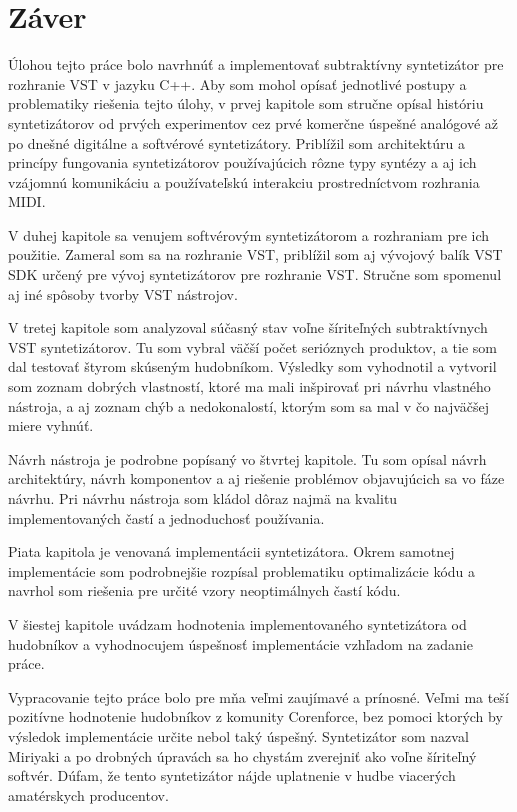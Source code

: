 \chapter*{Záver}



Úlohou tejto práce bolo navrhnúť a implementovať subtraktívny syntetizátor pre rozhranie VST v jazyku C++. Aby som mohol opísať jednotlivé postupy a problematiky riešenia tejto úlohy, v prvej kapitole som stručne opísal históriu syntetizátorov od prvých experimentov cez prvé komerčne úspešné analógové až po dnešné digitálne a softvérové syntetizátory. Priblížil som architektúru a princípy fungovania syntetizátorov používajúcich rôzne typy syntézy a aj ich vzájomnú komunikáciu a používateľskú interakciu prostredníctvom rozhrania MIDI.

V duhej kapitole sa venujem softvérovým syntetizátorom a rozhraniam pre ich použitie. Zameral som sa na rozhranie VST, priblížil som aj vývojový balík VST SDK určený pre vývoj syntetizátorov pre rozhranie VST. Stručne som spomenul aj iné spôsoby tvorby VST nástrojov. 

V tretej kapitole som analyzoval súčasný stav voľne šíriteľných subtraktívnych VST syntetizátorov. Tu som vybral väčší počet serióznych produktov, a tie som dal testovať štyrom skúseným hudobníkom. Výsledky som vyhodnotil a vytvoril som zoznam dobrých vlastností, ktoré ma mali inšpirovať pri návrhu vlastného nástroja, a aj zoznam chýb a nedokonalostí, ktorým som sa mal v čo najväčšej miere vyhnúť.

Návrh nástroja je podrobne popísaný vo štvrtej kapitole. Tu som opísal návrh architektúry, návrh komponentov a aj riešenie problémov objavujúcich sa vo fáze návrhu. Pri návrhu nástroja som kládol dôraz najmä na kvalitu implementovaných častí a jednoduchosť používania.

Piata kapitola je venovaná implementácii syntetizátora. Okrem samotnej implementácie som podrobnejšie rozpísal problematiku optimalizácie kódu a navrhol som riešenia pre určité vzory neoptimálnych častí kódu.

V šiestej kapitole uvádzam hodnotenia implementovaného syntetizátora od hudobníkov a vyhodnocujem úspešnosť implementácie vzhľadom na zadanie práce.

Vypracovanie tejto práce bolo pre mňa veľmi zaujímavé a prínosné. Veľmi ma teší pozitívne hodnotenie hudobníkov z komunity Corenforce, bez pomoci ktorých by výsledok implementácie určite nebol taký úspešný. Syntetizátor som nazval Miriyaki a po drobných úpravách sa ho chystám zverejniť ako voľne šíriteľný softvér. Dúfam, že tento syntetizátor nájde uplatnenie v hudbe viacerých amatérskych producentov.